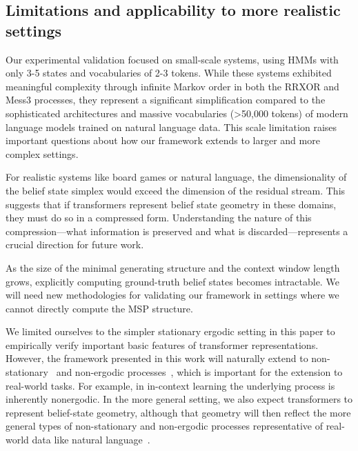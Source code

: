 \documentclass{article}
\begin{document}
\subsection{Limitations and applicability to more realistic settings}

Our experimental validation focused on small-scale systems, using HMMs with only 3-5 states and vocabularies of 2-3 tokens. While these systems exhibited meaningful complexity through infinite Markov order in both the RRXOR and Mess3 processes, they represent a significant simplification compared to the sophisticated architectures and massive vocabularies (>50,000 tokens) of modern language models trained on natural language data. This scale limitation raises important questions about how our framework extends to larger and more complex settings.

For realistic systems like board games or natural language, the dimensionality of the belief state simplex would exceed the dimension of the residual stream. This suggests that if transformers represent belief state geometry in these domains, they must do so in a compressed form. Understanding the nature of this compression—what information is preserved and what is discarded—represents a crucial direction for future work.

As the size of the minimal generating structure and the context window length grows, explicitly computing ground-truth belief states becomes intractable. We will need new methodologies for validating our framework in settings where we cannot directly compute the MSP structure.

We limited ourselves to the simpler stationary ergodic setting in this paper to empirically verify important basic features of transformer representations. However, the framework presented in this work will naturally extend to non-stationary~\cite{riechers2021fraudulent} and non-ergodic processes~\cite{crutchfield2015signatures}, which is important for the extension to real-world tasks. For example, in in-context learning the underlying process is inherently nonergodic. In the more general setting, we also expect transformers to represent belief-state geometry, although that geometry will then reflect the more general types of non-stationary and non-ergodic processes representative of real-world data like natural language~\cite{debowski2020information, dkebowski2023simplistic}.
\end{document}
